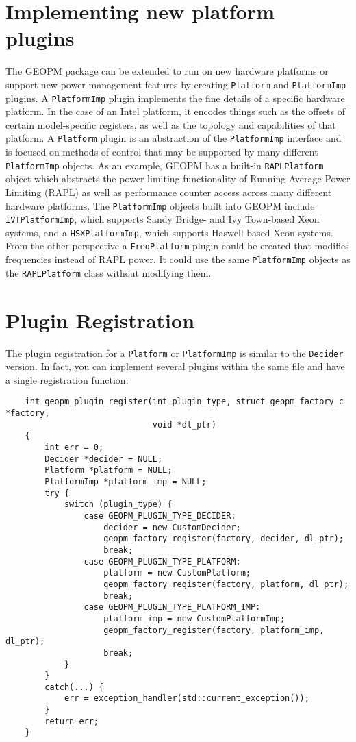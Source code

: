 \documentclass[11pt]{article}
\begin{document}
\section{Implementing new platform plugins}
The GEOPM package can be extended to run on new hardware platforms or
support new power management features by creating \verb#Platform# and
\verb#PlatformImp# plugins. A \verb#PlatformImp# plugin implements the
fine details of a specific hardware platform. In the case of an Intel
platform, it encodes things such as the offsets of certain model-specific
registers, as well as the topology and capabilities of that
platform. A \verb#Platform# plugin is an abstraction of the
\verb#PlatformImp# interface and is focused on methods of control that
may be supported by many different \verb#PlatformImp# objects. As an
example, GEOPM has a built-in \verb#RAPLPlatform# object which
abstracts the power limiting functionality of Running Average Power
Limiting (RAPL) as well as performance counter access
across many different hardware platforms. The \verb#PlatformImp#
objects built into GEOPM include \verb#IVTPlatformImp#, which supports
Sandy Bridge- and Ivy Town-based Xeon systems, and a
\verb#HSXPlatformImp#, which supports Haswell-based Xeon systems. From
the other perspective a \verb#FreqPlatform# plugin could be created
that modifies frequencies instead of RAPL power. It could use the same
\verb#PlatformImp# objects as the \verb#RAPLPlatform# class without
modifying them.

\section{Plugin Registration}
The plugin registration for a \verb#Platform# or \verb#PlatformImp# is
similar to the \verb#Decider# version. In fact, you can implement
several plugins within the same file and have a single registration
function:
\begin{verbatim}
    int geopm_plugin_register(int plugin_type, struct geopm_factory_c *factory,
                              void *dl_ptr)
    {
        int err = 0;
        Decider *decider = NULL;
        Platform *platform = NULL;
        PlatformImp *platform_imp = NULL;
        try {
            switch (plugin_type) {
                case GEOPM_PLUGIN_TYPE_DECIDER:
                    decider = new CustomDecider;
                    geopm_factory_register(factory, decider, dl_ptr);
                    break;
                case GEOPM_PLUGIN_TYPE_PLATFORM:
                    platform = new CustomPlatform;
                    geopm_factory_register(factory, platform, dl_ptr);
                    break;
                case GEOPM_PLUGIN_TYPE_PLATFORM_IMP:
                    platform_imp = new CustomPlatformImp;
                    geopm_factory_register(factory, platform_imp, dl_ptr);
                    break;
            }
        }
        catch(...) {
            err = exception_handler(std::current_exception());
        }
        return err;
    }
\end{verbatim}
\end{document}
